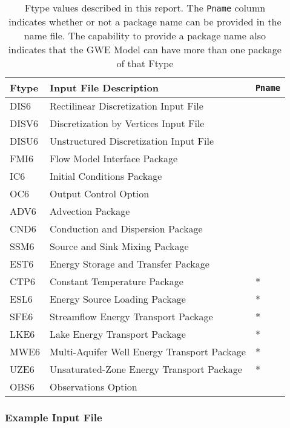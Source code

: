 \begin{table}[H]
\caption{Ftype values described in this report.  The \texttt{Pname} column indicates whether or not a package name can be provided in the name file.  The capability to provide a package name also indicates that the GWE Model can have more than one package of that Ftype}
\small
\begin{center}
\begin{tabular*}{\columnwidth}{l l l}
\hline
\hline
Ftype & Input File Description & \texttt{Pname}\\
\hline
DIS6 & Rectilinear Discretization Input File \\
DISV6 & Discretization by Vertices Input File \\
DISU6 & Unstructured Discretization Input File \\
FMI6 & Flow Model Interface Package &  \\ 
IC6 & Initial Conditions Package \\
OC6 & Output Control Option \\
ADV6 & Advection Package \\ 
CND6 & Conduction and Dispersion Package \\ 
SSM6 & Source and Sink Mixing Package \\ 
EST6 & Energy Storage and Transfer Package \\
CTP6 & Constant Temperature Package & * \\ 
ESL6 & Energy Source Loading Package & * \\
SFE6 & Streamflow Energy Transport Package & * \\
LKE6 & Lake Energy Transport Package & * \\
MWE6 & Multi-Aquifer Well Energy Transport Package & * \\
UZE6 & Unsaturated-Zone Energy Transport Package & * \\
OBS6 & Observations Option \\
\hline 
\end{tabular*}
\label{table:ftype}
\end{center}
\normalsize
\end{table}

\vspace{5mm}
\subsubsection{Example Input File}



